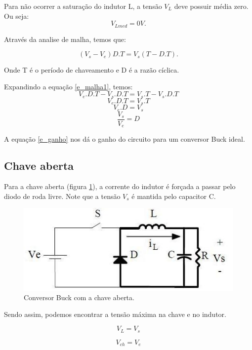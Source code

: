 Para não ocorrer a saturação do indutor L, a tensão $V_L$ deve possuir média zero. Ou seja:
\[V_{Lmed} = 0 V.\]

Através da analise de malha, temos que:

\begin{equation}
(V_s - V_e)D.T = V_s(T-D.T).
\label{e_malha1}
\end{equation}

Onde T é o período de chaveamento e D é a razão cíclica.

Expandindo a equação \ref{e_malha1}, temos:
\[V_e.D.T - V_s.D.T = V_s.T - V_s.D.T\]
\[V_e.D.T = V_s.T\]
\[V_e.D = V_s\]
\begin{equation}
\frac{V_s}{V_e} = D
\label{e_ganho}
\end{equation}

A equação \ref{e_ganho} nos dá o ganho do circuito para um conversor Buck ideal.

\subsection{Chave aberta}
Para a chave aberta (figura \ref{f_etp2}), a corrente do indutor é forçada a passar pelo diodo de roda livre. Note que a tensão $V_s$ é mantida pelo capacitor C.

\begin{figure}[H]
	\centering
	\includegraphics[scale=0.5]{Imagens/etp2.jpg}
	\caption{Conversor Buck com a chave aberta.}
	\label{f_etp2}
\end{figure}

Sendo assim, podemos encontrar a tensão máxima na chave e no indutor.

\begin{equation}
V_L = V_s
\end{equation}

\begin{equation}
V_{ch} = V_e
\end{equation}